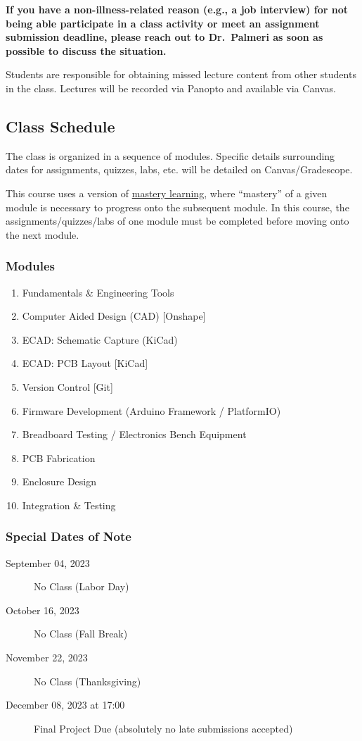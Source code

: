 \documentclass[10pt]{report}
\begin{document}
\textbf{If you have a non-illness-related reason (e.g., a job interview) for not
being able participate in a class activity or meet an assignment submission
deadline, please reach out to Dr.\ Palmeri as soon as possible to discuss the
situation.}

Students are responsible for obtaining missed lecture content from other
students in the class.  Lectures will be recorded via Panopto and available via
Canvas.

\subsection*{Class Schedule} 
The class is organized in a sequence of modules.  Specific details surrounding
dates for assignments, quizzes, labs, etc. will be detailed on
Canvas/Gradescope.

This course uses a version of
\href{https://en.wikipedia.org/wiki/Mastery_learning}{mastery learning}, where
``mastery'' of a given module is necessary to progress onto the subsequent
module.  In this course, the assignments/quizzes/labs of one module must be
completed before moving onto the next module.

\subsubsection*{Modules}
\begin{enumerate}
    \item Fundamentals \& Engineering Tools
    \item Computer Aided Design (CAD) [Onshape]
    \item ECAD: Schematic Capture (KiCad)
    \item ECAD: PCB Layout [KiCad]
    \item Version Control [Git]
    \item Firmware Development (Arduino Framework / PlatformIO)
    \item Breadboard Testing / Electronics Bench Equipment
    \item PCB Fabrication
    \item Enclosure Design
    \item Integration \& Testing
\end{enumerate}

\subsubsection*{Special Dates of Note}
\begin{description}
    \item[September 04, 2023] No Class (Labor Day)
    \item[October 16, 2023] No Class (Fall Break)
    \item[November 22, 2023] No Class (Thanksgiving)
    \item[December 08, 2023 at 17:00] Final Project Due (absolutely no late submissions accepted)
\end{description}
\end{document}
